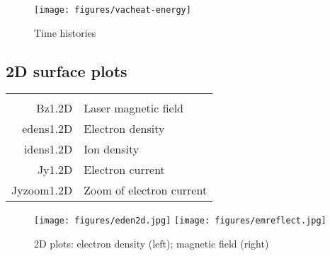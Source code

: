 \documentclass[11pt]{article}
\begin{document}
\begin{figure}[ht]
\begin{center}
\texttt{[image: figures/vacheat-energy]}
\caption{Time histories}
\end{center}
\end{figure}


\subsection{2D surface plots} 
\begin{tabular}{rl}
\hline\\ 

 Bz1.2D& Laser magnetic field \\
 edens1.2D& Electron density \\
 idens1.2D& Ion density \\
 Jy1.2D& Electron current \\
 Jyzoom1.2D& Zoom of electron current\\
\end{tabular}
\begin{figure}[ht]
\begin{center}
\texttt{[image: figures/eden2d.jpg]} \hspace{1cm}
\texttt{[image: figures/emreflect.jpg]}
\caption{2D plots: electron density (left); magnetic field (right)}
\end{center}
\end{figure}
\end{document}
